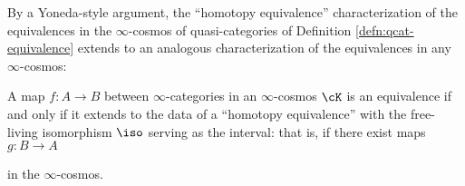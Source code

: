 By a Yoneda-style argument, the ``homotopy equivalence'' characterization of the equivalences in the $\infty$-cosmos of quasi-categories of Definition \ref{defn:qcat-equivalence} extends to an analogous characterization of the equivalences in any $\infty$-cosmos:

\begin{lemma}\label{lem:equiv-htpy-equiv}
A map $f \colon A \to B$ between $\infty$-categories in an $\infty$-cosmos $\cK$ is an equivalence if and only if it extends to the data of a ``homotopy equivalence'' with the free-living isomorphism $\iso$ serving as the interval: that is, if there exist maps $g \colon B \to A$
\begin{center}
\end{center}
in the $\infty$-cosmos.
\end{lemma}
